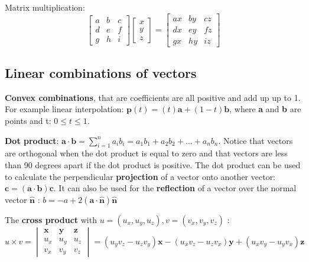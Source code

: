 	Matrix multiplication:
	\begin{equation}
	\begin{bmatrix} a& b& c \\ 
	                d& e& f \\
	                g& h& i\end{bmatrix} 
	                \begin{bmatrix} x \\ y \\ z \end{bmatrix} = 
	                \begin{bmatrix} ax& by& cz \\ 
	                dx& ey& fz \\
	                gx& hy& iz\end{bmatrix}           
	\end{equation}

	\subsection*{Linear combinations of vectors} 
	\textbf{Convex combinations}, that are coefficients are all positive and add up up to 1. For example linear interpolation: $\textbf{p}(t) = (t)\textbf{a} + (1-t)\textbf{b}$, where \textbf{a} and \textbf{b} are points and t: $0 \le t \le 1$. 

	\noindent \textbf{Dot product}: $\textbf{a} \cdot \textbf{b} = \sum_{i=1}^{n} a_i b_i = a_1b_1 + a_2b_2 + \ldots + a_nb_n$. Notice that vectors are orthogonal when the dot product is equal to zero and that vectors are less than 90 degrees apart if the dot product is positive. The dot product can be used to calculate the perpendicular \textbf{projection} of a vector onto another vector: $\textbf{c} = (\textbf{a} \cdot \textbf{b})\textbf{c}$. It can also be used for the \textbf{reflection} of a vector over the normal vector $\hat{\textbf{n}}$ : $b = -a + 2(\textbf{a} \cdot \hat{\textbf{n}})\hat{\textbf{n}}$

	The \textbf{cross product} with $u = (u_x,u_y,u_z), v = (v_x,v_y,v_z)$ : 
	\begin{equation}
	 	u \times v = \begin{vmatrix}
     \textbf{x} & \textbf{y} & \textbf{z}\\ 
     u_{x} & u_{y} & u_{z}\\
     v_{x} & v_{y} & v_{z} 
	\end{vmatrix} = (u_yv_z-u_zv_y)\textbf{x} - (u_xv_z - u_zv_x)\textbf{y} + (u_xv_y-u_yv_x)\textbf{z}
	\end{equation} 

